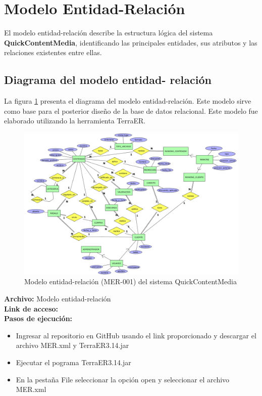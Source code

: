\section{Modelo Entidad-Relación}
El modelo entidad-relación describe la estructura lógica del sistema \textbf{QuickContentMedia},  identificando las principales entidades, sus atributos y las relaciones existentes entre ellas. 

\subsection{Diagrama del modelo entidad-
relación}
La figura \ref{fig:MER} presenta el diagrama del modelo entidad-relación. Este modelo sirve como base para el posterior diseño de la base de datos relacional. Este modelo fue elaborado utilizando la herramienta TerraER.

\begin{figure}[H]
    \centering
    \includegraphics[width=1\linewidth]{Media/3_Analisis/3_ModeloEntidadRelacion/MER.png}
    \caption{Modelo entidad-relación (MER-001) del sistema QuickContentMedia}
    \label{fig:MER}
\end{figure}

\textbf{Archivo:} {Modelo entidad-relación} \\
\textbf{Link de acceso:} \linkMER \\

\textbf{Pasos de ejecución:}
\begin{itemize}
    \item Ingresar al repositorio en GitHub usando el link proporcionado y descargar el archivo MER.xml y TerraER3.14.jar
    \item Ejecutar el pograma TerraER3.14.jar
    \item En la pestaña File seleccionar la opción open y seleccionar el archivo MER.xml
\end{itemize}




